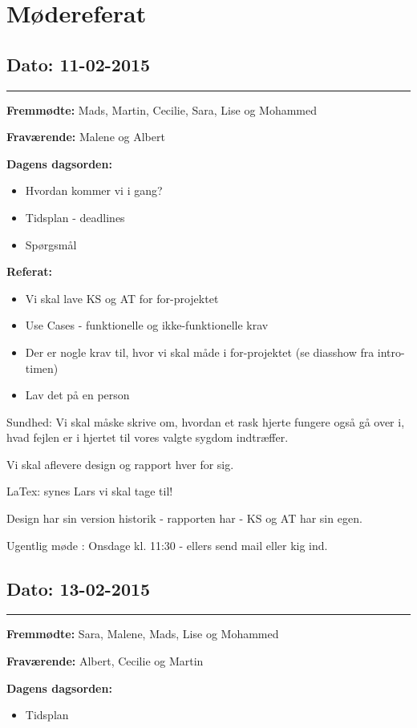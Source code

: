 \chapter{Mødereferat}

\section{Dato: 11-02-2015}
\hrule

\textbf{Fremmødte:} Mads, Martin, Cecilie, Sara, Lise og Mohammed

\textbf{Fraværende:} Malene og Albert

\textbf{Dagens dagsorden:}
\begin{itemize}
	\item Hvordan kommer vi i gang? 
	\item Tidsplan - deadlines
	\item Spørgsmål
\end{itemize}

\textbf{Referat:}
\begin{itemize}
	\item Vi skal lave KS og AT for for-projektet
	\item Use Cases - funktionelle og ikke-funktionelle krav
	\item Der er nogle krav til, hvor vi skal måde i for-projektet (se diasshow fra intro-timen)
	\item Lav det på en person
\end{itemize} 

Sundhed: Vi skal måske skrive om, hvordan et rask hjerte fungere også gå over i, hvad fejlen er i hjertet til vores valgte sygdom indtræffer.  

Vi skal aflevere design og rapport hver for sig. 

LaTex: synes Lars vi skal tage til! 

Design har sin version historik - rapporten har - KS og AT har sin egen.  

Ugentlig møde : Onsdage kl. 11:30 - ellers send mail eller kig ind.  


\section{Dato: 13-02-2015}
\hrule

\textbf{Fremmødte:} Sara, Malene, Mads, Lise og Mohammed 

\textbf{Fraværende:} Albert, Cecilie og Martin

\textbf{Dagens dagsorden:}
\begin{itemize}
	\item Tidsplan
\end{itemize}

